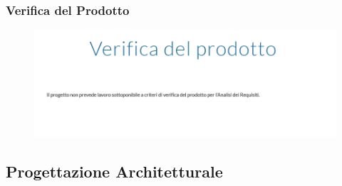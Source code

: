 \subsubsection{Verifica del Prodotto}
\begin{figure}[H]
	\includegraphics[scale=0.55]{res/images/cruscotto/adr_7.png}
\end{figure}
\pagebreak
\subsection{Progettazione Architetturale}
